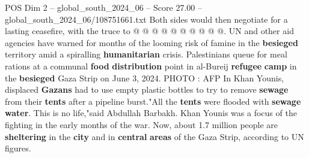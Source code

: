 \begin{textsample}{POS Dim 2 – global\_south\_2024\_06 – Score 27.00 – global\_south\_2024\_06/108751661.txt}
Both sides would then negotiate for a lasting ceasefire, with the truce to @ @ @ @ @ @ @ @ @ @.
UN and other aid agencies have warned for months of the looming risk of famine in the \textbf{besieged} territory amid a spiralling \textbf{humanitarian} crisis.
Palestinians queue for meal rations at a communal \textbf{food} \textbf{distribution} point in al-Bureij \textbf{refugee} \textbf{camp} in the \textbf{besieged} Gaza Strip on June 3, 2024.
PHOTO : AFP In Khan Younis, displaced \textbf{Gazans} had to use empty plastic bottles to try to remove \textbf{sewage} from their \textbf{tents} after a pipeline burst."All the \textbf{tents} were flooded with \textbf{sewage} \textbf{water}.
This is no life,"said Abdullah Barbakh.
Khan Younis was a focus of the fighting in the early months of the war.
Now, about 1.7 million people are \textbf{sheltering} in the \textbf{city} and in \textbf{central} \textbf{areas} of the Gaza Strip, according to UN figures.

\end{textsample}
